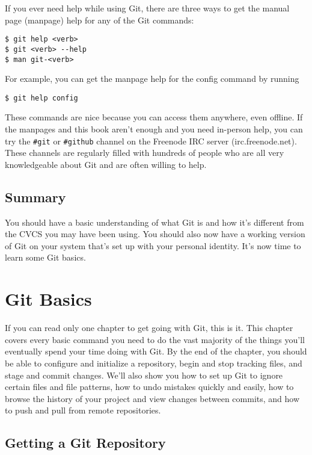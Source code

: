 \documentclass[a4paper]{book}
\newcommand{\chap}[1]{\newpage\thispagestyle{empty}\chapter{#1}\label{chap:\thechapter}}
\begin{document}
If you ever need help while using Git, there are three ways to get the manual page (manpage) help for any of the Git commands:

\begin{shaded}\begin{verbatim}
$ git help <verb>
$ git <verb> --help
$ man git-<verb>
\end{verbatim}\end{shaded}

For example, you can get the manpage help for the config command by running

\begin{shaded}\begin{verbatim}
$ git help config
\end{verbatim}\end{shaded}

These commands are nice because you can access them anywhere, even offline. If the manpages and this book aren't enough and you need in-person help, you can try the \texttt{\#git} or \texttt{\#github} channel on the Freenode IRC server (irc.freenode.net). These channels are regularly filled with hundreds of people who are all very knowledgeable about Git and are often willing to help.

\section{Summary}\label{summary}

You should have a basic understanding of what Git is and how it's different from the CVCS you may have been using. You should also now have a working version of Git on your system that's set up with your personal identity. It's now time to learn some Git basics.

\chap{Git Basics}\label{git-basics-1}

If you can read only one chapter to get going with Git, this is it. This chapter covers every basic command you need to do the vast majority of the things you'll eventually spend your time doing with Git. By the end of the chapter, you should be able to configure and initialize a repository, begin and stop tracking files, and stage and commit changes. We'll also show you how to set up Git to ignore certain files and file patterns, how to undo mistakes quickly and easily, how to browse the history of your project and view changes between commits, and how to push and pull from remote repositories.

\section{Getting a Git Repository}\label{getting-a-git-repository}
\end{document}
